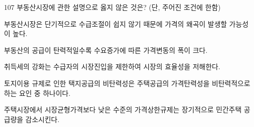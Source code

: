\begin{question}{107}
부동산시장에 관한 설명으로 옳지 않은 것은? (단, 주어진 조건에 한함)
\begin{choices}
  \item 부동산시장은 단기적으로 수급조절이 쉽지 않기 때문에 가격의 왜곡이 발생할 가능성이 높다.
  \item 부동산의 공급이 탄력적일수록 수요증가에 따른 가격변동의 폭이 크다.
  \item 취득세의 강화는 수급자의 시장진입을 제한하여 시장의 효율성을 저해한다.
  \item 토지이용 규제로 인한 택지공급의 비탄력성은 주택공급의 가격탄력성을 비탄력적으로 하는 요인 중 하나이다.
  \item 주택시장에서 시장균형가격보다 낮은 수준의 가격상한규제는 장기적으로 민간주택 공급량을 감소시킨다.
\end{choices}
\end{question}
